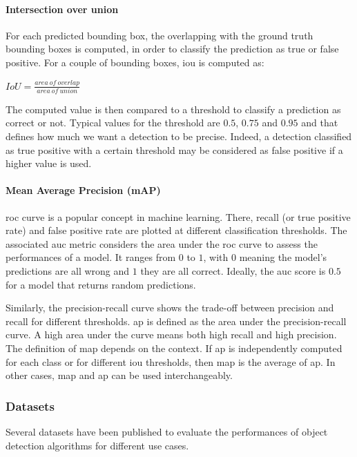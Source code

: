 \documentclass[%
    corpo=12pt,
    twoside,
    stile=classica,   
    tipotesi=magistrale,
    evenboxes,
    english,
	numerazioneromana,
]{toptesi}
\begin{document}
\paragraph{Intersection over union}
For each predicted bounding box, the overlapping with the ground truth bounding boxes is computed, in order to classify the prediction as true or false positive. For a couple of bounding boxes, \gls{iou} is computed as:
\begin{center}
	$IoU = \frac{area\ of\ overlap}{area\ of\ union}$
\end{center}
The computed value is then compared to a threshold to classify a prediction as correct or not. Typical values for the threshold are $0.5$, $0.75$ and $0.95$ and that defines how much we want a detection to be precise. Indeed, a detection classified as true positive with a certain threshold may be considered as false positive if a higher value is used.

\paragraph{Mean Average Precision (mAP)}
\gls{roc} curve is a popular concept in machine learning. There, recall (or true positive rate) and false positive rate are plotted at different classification thresholds. The associated \gls{auc} metric considers the area under the \gls{roc} curve to assess the performances of a model.\cite{roc} It ranges from $ 0 $ to $ 1 $, with $ 0 $ meaning the model's predictions are all wrong and $ 1 $ they are all correct. Ideally, the \gls{auc} score is $ 0.5 $ for a model that returns random predictions.

Similarly, the precision-recall curve shows the trade-off between precision and recall for different thresholds\cite{precrecall}. \gls{ap} is defined as the area under the precision-recall curve. A high area under the curve means both high recall and high precision. The definition of \gls{map} depends on the context. If \gls{ap} is independently computed for each class or for different \gls{iou} thresholds, then \gls{map} is the average of \gls{ap}. In other cases, \gls{map} and \gls{ap} can be used interchangeably.


\subsubsection{Datasets}\label{sec:datasets}
Several datasets have been published to evaluate the performances of object detection algorithms for different use cases.
\end{document}
